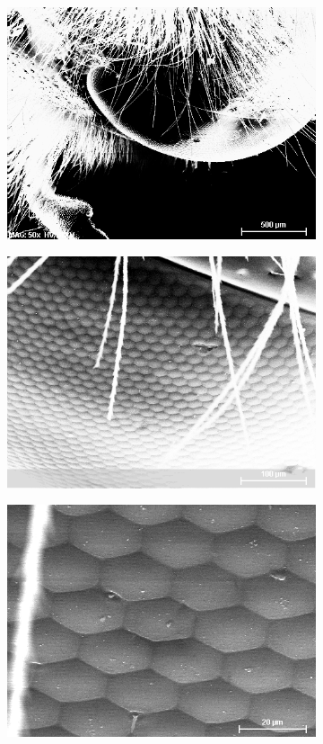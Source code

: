 \begin{figure}[H]
	\centering
	\begin{subfigure}[c]{.45\textwidth}
		\centering
		\includegraphics[width=.8\textwidth]{raw/SEM/Hummelauge_M0050}
	\end{subfigure}
	\begin{subfigure}[c]{.45\textwidth}
		\centering
		\includegraphics[width=.8\textwidth]{raw/SEM/Hummelauge_M0252}
	\end{subfigure}
	\begin{subfigure}[c]{.45\textwidth}
		\centering
		\includegraphics[width=.8\textwidth]{raw/SEM/Hummelauge_M1300}

\end{subfigure}
\end{figure}
